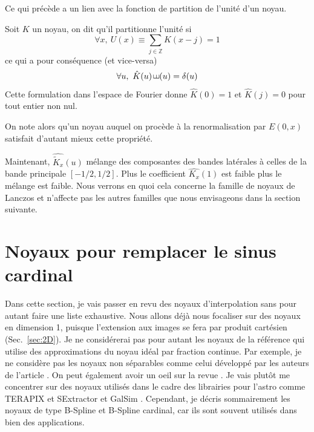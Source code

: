 \documentclass[11pt,twoside]{article}
\DeclareMathOperator{\comb}{\raisebox{\depth}{\rotatebox{270}{$\exists$}}}
\begin{document}
Ce qui précède a un lien avec la fonction de partition de l'unité d'un noyau.
\begin{propriete}\label{prop:unite}
Soit $K$ un noyau, on dit  qu'il partitionne l'unité si
\begin{equation}
\forall x,\ U(x)\equiv \sum_{j\in\mathbb{Z}} K(x-j) = 1 
\end{equation} 
ce qui a pour conséquence (et vice-versa)
\begin{equation}
\forall u,\ \hat{K}(u) \comb(u)=\delta(u)
\end{equation}
Cette formulation dans l'espace de Fourier donne $\hat{K}(0)=1$ et $\hat{K}(j)=0$ pour tout entier non nul.
\end{propriete} 
On note alors qu'un noyau auquel on procède à la renormalisation par $E(0,x)$ satisfait d'autant mieux cette propriété.
 

Maintenant,  $\widehat{\tilde{K}_x}(u)$ mélange des composantes des  bandes latérales à celles de la bande principale $[-1/2,1/2]$. Plus le coefficient $\hat{K_x}(1)$ est faible plus le mélange est faible. Nous verrons en quoi cela concerne la famille de noyaux de Lanczos et n'affecte pas les autres familles que nous envisageons dans la section suivante.
%
\section{Noyaux pour remplacer le sinus cardinal}
%
Dans cette section, je vais passer en revu des noyaux d'interpolation sans pour autant faire une liste exhaustive. Nous allons déjà nous focaliser sur des noyaux en dimension 1, puisque l'extension aux images se fera par produit cartésien (Sec.~\ref{sec:2D}). Je ne considérerai pas pour autant les noyaux de la référence \citep{HU200646} qui utilise des approximations du noyau idéal par fraction continue. Par exemple, je ne considère pas les noyaux non séparables comme celui développé par les auteurs de l'article \citep{Shi2006ImageIB}. On peut également avoir un oeil sur la revue \cite{Parsania2016}. Je vais plutôt me concentrer sur des noyaux utilisés dans le cadre des librairies pour l'astro comme \textsf{TERAPIX}  et \textsf{SExtractor} \citep{2011ASPC..442..435B} et \textsf{GalSim} \citep{2015A&C....10..121R}. Cependant, je décris sommairement les noyaux de type B-Spline et B-Spline cardinal, car ils sont souvent utilisés dans bien des applications.
%
\end{document}
